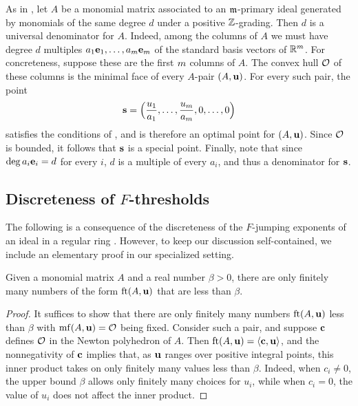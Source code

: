 \documentclass{amsart}
\begin{document}
\begin{example}
   \label{ex: m-primary homogeneous case 2}
   As in , let $A$ be a monomial matrix associated to an $\mathfrak{m}$-primary ideal generated by monomials of the same degree $d$ under a positive $\mathbb{Z}$-grading.
   Then $d$ is a universal denominator for $A$.
   Indeed, among the columns of $A$ we must have degree $d$ multiples $a_1\mathbf{e}_1,\ldots,a_m\mathbf{e}_m$ of the standard basis vectors of $\mathbb{R}^m$.
   For concreteness, suppose these are the first $m$ columns of $A$.
   The convex hull $\mathcal{O}$ of these columns is the minimal face of every $A$-pair $(A,\mathbf{u})$.
   For every such pair, the point
   \[\mathbf{s} = \Big(\frac{u_1}{a_1},\ldots,\frac{u_m}{a_m},0,\ldots,0\Big)\]
   satisfies the conditions of , and is therefore an optimal point for $(A,\mathbf{u})$.
   Since $\mathcal{O}$ is bounded, it follows that $\mathbf{s}$ is a special point.
   Finally, note that since $\deg a_i\mathbf{e}_i = d$ for every $i$, $d$ is a multiple of every $a_i$, and thus a denominator for $\mathbf{s}$.
\end{example}

\subsection{Discreteness of $F$-thresholds}

The following is a consequence of the discreteness of the $F$-jumping exponents of an ideal in a regular ring \cite[Theorem~3.1]{blickle+mustata+smith.discr_rat_FPTs}.
However, to keep our discussion self-contained, we include an elementary proof in our specialized setting.

\begin{proposition}
   \label{discreteness: P}
   Given a monomial matrix $A$ and a real number $\beta > 0 $, there are only finitely many numbers of the form $\operatorname{ft}(A, \mathbf{u})$ that are less than $\beta$.
\end{proposition}

\begin{proof}
   It suffices to show that there are only finitely many numbers $\operatorname{ft}(A, \mathbf{u})$ less than $\beta$ with $\operatorname{mf}(A, \mathbf{u}) = \mathcal{O}$ being fixed.
   Consider such a pair, and suppose $\mathbf{c}$ defines $\mathcal{O}$ in the Newton polyhedron of $A$.
   Then $\operatorname{ft}(A, \mathbf{u}) = \langle \mathbf{c}, \mathbf{u} \rangle$, and the nonnegativity of $\mathbf{c}$ implies that, as $\mathbf{u}$ ranges over positive integral points, this inner product takes on only finitely many values less than $\beta$.
   Indeed, when $c_i \ne 0$, the upper bound $\beta$ allows only finitely many choices for $u_i$, while when $c_i = 0$, the value of $u_i$ does not affect the inner product.
\end{proof}
\end{document}
